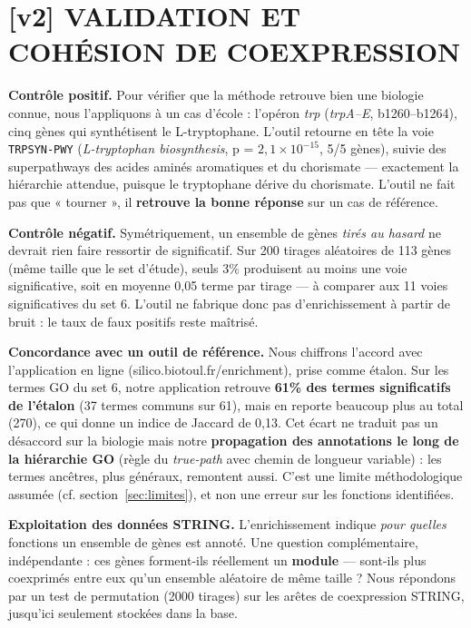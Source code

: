 \documentclass[a4paper,11pt,openright]{report}
\begin{document}
\section{[v2] VALIDATION ET COHÉSION DE COEXPRESSION}

\textbf{Contrôle positif.} Pour vérifier que la méthode retrouve bien une biologie connue, nous l'appliquons à un cas d'école : l'opéron \textit{trp} (\textit{trpA--E}, b1260--b1264), cinq gènes qui synthétisent le L-tryptophane. L'outil retourne en tête la voie \texttt{TRPSYN-PWY} (\textit{L-tryptophan biosynthesis}, p = $2{,}1\times10^{-15}$, 5/5 gènes), suivie des superpathways des acides aminés aromatiques et du chorismate --- exactement la hiérarchie attendue, puisque le tryptophane dérive du chorismate. L'outil ne fait pas que « tourner », il \textbf{retrouve la bonne réponse} sur un cas de référence.

\textbf{Contrôle négatif.} Symétriquement, un ensemble de gènes \textit{tirés au hasard} ne devrait rien faire ressortir de significatif. Sur 200 tirages aléatoires de 113 gènes (même taille que le set d'étude), seuls 3\% produisent au moins une voie significative, soit en moyenne 0,05 terme par tirage --- à comparer aux 11 voies significatives du set 6. L'outil ne fabrique donc pas d'enrichissement à partir de bruit : le taux de faux positifs reste maîtrisé.

\textbf{Concordance avec un outil de référence.} Nous chiffrons l'accord avec l'application en ligne (silico.biotoul.fr/enrichment), prise comme étalon. Sur les termes GO du set 6, notre application retrouve \textbf{61\% des termes significatifs de l'étalon} (37 termes communs sur 61), mais en reporte beaucoup plus au total (270), ce qui donne un indice de Jaccard de 0,13. Cet écart ne traduit pas un désaccord sur la biologie mais notre \textbf{propagation des annotations le long de la hiérarchie GO} (règle du \textit{true-path} avec chemin de longueur variable) : les termes ancêtres, plus généraux, remontent aussi. C'est une limite méthodologique assumée (cf. section~\ref{sec:limites}), et non une erreur sur les fonctions identifiées.

\textbf{Exploitation des données STRING.} L'enrichissement indique \textit{pour quelles} fonctions un ensemble de gènes est annoté. Une question complémentaire, indépendante : ces gènes forment-ils réellement un \textbf{module} --- sont-ils plus coexprimés entre eux qu'un ensemble aléatoire de même taille ? Nous répondons par un test de permutation (2000 tirages) sur les arêtes de coexpression STRING, jusqu'ici seulement stockées dans la base.
\end{document}
